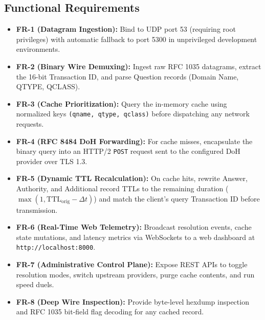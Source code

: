 \documentclass[10pt,a4paper]{article}
\begin{document}
\subsection{Functional Requirements}
\begin{itemize}\itemsep 1pt
    \item \textbf{FR-1 (Datagram Ingestion):} Bind to UDP port 53 (requiring root privileges) with automatic fallback to port 5300 in unprivileged development environments.
    \item \textbf{FR-2 (Binary Wire Demuxing):} Ingest raw RFC 1035 datagrams, extract the 16-bit Transaction ID, and parse Question records (Domain Name, QTYPE, QCLASS).
    \item \textbf{FR-3 (Cache Prioritization):} Query the in-memory cache using normalized keys \texttt{(qname, qtype, qclass)} before dispatching any network requests.
    \item \textbf{FR-4 (RFC 8484 DoH Forwarding):} For cache misses, encapsulate the binary query into an HTTP/2 \texttt{POST} request sent to the configured DoH provider over TLS 1.3.
    \item \textbf{FR-5 (Dynamic TTL Recalculation):} On cache hits, rewrite Answer, Authority, and Additional record TTLs to the remaining duration ($\max(1, \text{TTL}_{\text{orig}} - \Delta t)$) and match the client's query Transaction ID before transmission.
    \item \textbf{FR-6 (Real-Time Web Telemetry):} Broadcast resolution events, cache state mutations, and latency metrics via WebSockets to a web dashboard at \texttt{http://localhost:8000}.
    \item \textbf{FR-7 (Administrative Control Plane):} Expose REST APIs to toggle resolution modes, switch upstream providers, purge cache contents, and run speed duels.
    \item \textbf{FR-8 (Deep Wire Inspection):} Provide byte-level hexdump inspection and RFC 1035 bit-field flag decoding for any cached record.
\end{itemize}
\end{document}
